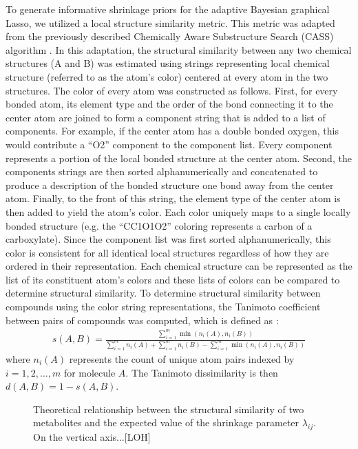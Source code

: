 \begin{DoubleSpace*}
To generate informative shrinkage priors for the adaptive Bayesian graphical Lasso, we utilized a local structure similarity metric. This metric was adapted from the previously described Chemically Aware Substructure Search (CASS) algorithm \cite{mitchell2014}. In this adaptation, the structural similarity between any two chemical structures (A and B)  was estimated using strings representing local chemical structure (referred to as the atom’s color) centered at every atom in the two structures. The color of every atom was constructed as follows. First, for every bonded atom, its element type and the order of the bond connecting it to the center atom are joined to form a component string that is added to a list of components. For example, if the center atom has a double bonded oxygen, this would contribute a ``O2'' component to the component list. Every component represents a portion of the local bonded structure at the center atom. Second, the components strings are then sorted alphanumerically and concatenated to produce a description of the bonded structure one bond away from the center atom. Finally, to the front of this string, the element type of the center atom is then added to yield the atom’s color. Each color uniquely maps to a single locally bonded structure (e.g. the ``CC1O1O2'' coloring represents a carbon of a carboxylate). Since the component list was first sorted alphanumerically, this color is consistent for all identical local structures regardless of how they are ordered in their representation. Each chemical structure can be represented as the list of its constituent atom’s colors and these lists of colors can be compared to determine structural similarity. To determine structural similarity between compounds using the color string representations, the Tanimoto coefficient between pairs of compounds was computed, which is defined as \cite{chen2002}:
\begin{align}
	s(A,B)=\frac{\sum_{i=1}^m \min \left(n_i(A),n_i(B) \right)}{\sum_{i=1}^m n_i(A)+\sum_{i=1}^m n_i(B)-\sum_{i=1}^m \min \left(n_i(A),n_i(B) \right)}
\end{align}
where $n_i(A)$ represents the count of unique atom pairs indexed by $i=1,2,\hdots,m$ for molecule $A$. The Tanimoto dissimilarity is then $d(A,B)=1-s(A,B)$. 

\begin{figure}[ht]
	\caption[Structural similarity versus shrinkage]{Theoretical relationship between the structural similarity of two metabolites and the expected value of the shrinkage parameter $\lambda_{ij}$. On the vertical axis...[LOH] \label{fig:simShrink} }
\end{figure}


\end{DoubleSpace*}
